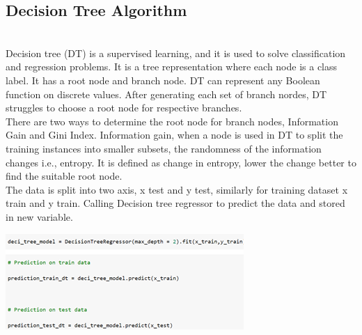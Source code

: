 \documentclass[journal,twoside,web]{ieeecolor}
\begin{document}
\subsection{Decision Tree Algorithm}
\\
Decision tree (DT) is a supervised learning, and it is used to solve classification and regression problems. It is a tree representation where each node is a class label. It has a root node and branch node. DT can represent any Boolean function on discrete values. After generating each set of branch nordes, DT struggles to choose  a root node for respective branches.
\\
There are two ways to determine the root node for branch nodes, Information Gain and Gini Index. Information gain, when a node is used in DT to split the training instances into smaller subsets, the randomness of the information changes i.e., entropy. It is defined as change in entropy, lower the change better to find the suitable root node.
\\
The data is split into two  axis,  x test  and  y test,  similarly for training dataset x train and y train. Calling Decision tree regressor to predict the data and stored in new variable.
\\
\begin{center}
\includegraphics[scale=0.60]{Picture7.png}
\end{center}
\\
\end{document}
